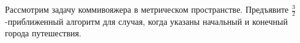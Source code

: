 Рассмотрим задачу коммивояжера в метрическом пространстве. Предъявите $\frac{3}{2}$-приближенный
алгоритм для случая, когда указаны начальный и конечный города путешествия.